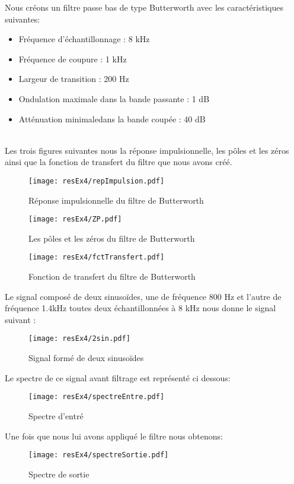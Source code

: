 Nous créons un filtre passe bas de type Butterworth avec les caractéristiques suivantes:\\
\begin{itemize}
\item Fréquence d'échantillonnage : 8 kHz
\item Fréquence de coupure : 1 kHz
\item Largeur de transition : 200 Hz
\item Ondulation maximale dans la bande passante : 1 dB
\item Atténuation minimaledans la bande coupée : 40 dB
\end{itemize}
~\\
Les trois figures suivantes nous la réponse impulsionnelle, les pôles et les zéros ainsi que la fonction de transfert du filtre que nous avons créé.

\begin{figure}[H]
\centering
\texttt{[image: resEx4/repImpulsion.pdf]}
\caption{Réponse impulsionnelle du filtre de Butterworth}
\end{figure}

\begin{figure}[H]
\centering
\texttt{[image: resEx4/ZP.pdf]}
\caption{Les pôles et les zéros du filtre de Butterworth}
\end{figure}

\begin{figure}[H]
\centering
\texttt{[image: resEx4/fctTransfert.pdf]}
\caption{Fonction de transfert du filtre de Butterworth}
\end{figure}

Le signal composé de deux sinusoïdes, une de fréquence 800 Hz et l'autre de fréquence 1.4kHz toutes deux échantillonnées à 8 kHz nous donne le signal suivant : 

\begin{figure}[H]
\centering
\texttt{[image: resEx4/2sin.pdf]}
\caption{Signal formé de deux sinusoïdes}
\end{figure}

Le spectre de ce signal avant filtrage est représenté ci dessous:

\begin{figure}[H]
\centering
\texttt{[image: resEx4/spectreEntre.pdf]}
\caption{Spectre d'entré}
\end{figure}

Une fois que nous lui avons appliqué le filtre nous obtenons:

\begin{figure}[H]
\centering
\texttt{[image: resEx4/spectreSortie.pdf]}
\caption{Spectre de sortie}
\end{figure}
